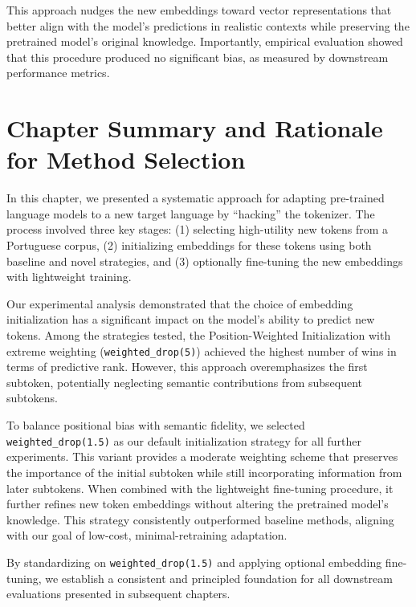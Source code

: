 This approach nudges the new embeddings toward vector representations that better align with the model's predictions in realistic contexts while preserving the pretrained model's original knowledge. Importantly, empirical evaluation showed that this procedure produced no significant bias, as measured by downstream performance metrics.




\section{Chapter Summary and Rationale for Method Selection}

In this chapter, we presented a systematic approach for adapting pre-trained language models to a new target language by “hacking” the tokenizer. The process involved three key stages: (1) selecting high-utility new tokens from a Portuguese corpus, (2) initializing embeddings for these tokens using both baseline and novel strategies, and (3) optionally fine-tuning the new embeddings with lightweight training. 

Our experimental analysis demonstrated that the choice of embedding initialization has a significant impact on the model’s ability to predict new tokens. Among the strategies tested, the Position-Weighted Initialization with extreme weighting (\texttt{weighted\_drop(5)}) achieved the highest number of wins in terms of predictive rank. However, this approach overemphasizes the first subtoken, potentially neglecting semantic contributions from subsequent subtokens.

To balance positional bias with semantic fidelity, we selected \texttt{weighted\_drop(1.5)} as our default initialization strategy for all further experiments. This variant provides a moderate weighting scheme that preserves the importance of the initial subtoken while still incorporating information from later subtokens. When combined with the lightweight fine-tuning procedure, it further refines new token embeddings without altering the pretrained model’s knowledge. This strategy consistently outperformed baseline methods, aligning with our goal of low-cost, minimal-retraining adaptation. 

By standardizing on \texttt{weighted\_drop(1.5)} and applying optional embedding fine-tuning, we establish a consistent and principled foundation for all downstream evaluations presented in subsequent chapters.
































